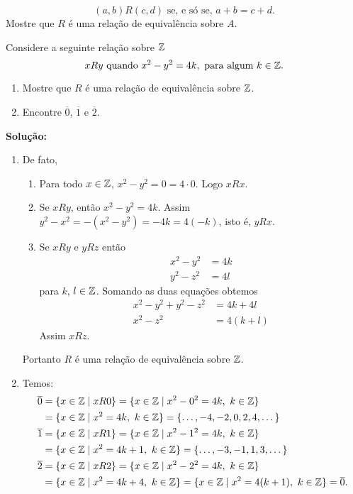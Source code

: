 \documentclass[12pt]{article}
\begin{document}
\[
	(a,b)R(c,d) \mbox{ se, e s\'o se, } a + b = c + d.
\]
Mostre que $R$ \'e uma rela\c{c}\~ao de equival\^encia sobre $A$.

\vspace{.5cm}

\questao Considere a seguinte rela\c{c}\~ao sobre $\mathbb{Z}$
\[
	xRy \mbox{ quando } x^2 - y^2 = 4k, \mbox{ para algum } k \in \mathbb{Z}.
\]

\begin{enumerate}[label={\alph*})]
	\item Mostre que $R$ \'e uma rela{\c c}{\~a}o de equival{\^e}ncia sobre $\mathbb{Z}$.
	\item Encontre $\overline{0}$, $\overline{1}$ e $\overline{2}$.
\end{enumerate}

\noindent\textbf{Solu\c{c}\~ao:}
	\begin{enumerate}[label={\alph*})]
		\item De fato,
		\begin{enumerate}[label={\roman*})]
			\item Para todo $x \in \mathbb{Z}$, $x^2 - y^2 = 0 = 4\cdot 0$. Logo $xRx$.
			\item Se $xRy$, ent\~ao $x^2 - y^2 = 4k$. Assim $y^2 - x^2 = -(x^2 - y^2) = -4k = 4(-k)$, isto \'e, $yRx$.
			\item Se $xRy$ e $yRz$ ent\~ao
			\begin{align*}
				x^2 - y^2 &= 4k\\
				y^2 - z^2 &= 4l
			\end{align*}
			para $k$, $l \in \mathbb{Z}$.
			Somando as duas equa\c{c}\~oes obtemos
			\begin{align*}\label{terceira_equacao}
				x^2 - y^2 + y^2 - z^2 &= 4k + 4l\\
				x^2 - z^2 &= 4(k + l)
			\end{align*}
			Assim $xRz$.
		\end{enumerate}

		Portanto $R$ \'e uma rela\c{c}\~ao de equival\^encia sobre $\mathbb{Z}$.

		\item Temos:
		\begin{align*}
			\overline{0} &= \{x \in \mathbb{Z} \mid xR0\} = \{x \in \mathbb{Z} \mid x^2 - 0^2 = 4k,\ k \in \mathbb{Z}\} \\
			&= \{x \in \mathbb{Z} \mid x^2 = 4k, \ k \in \mathbb{Z}\} = \{\dots, -4,-2,0,2,4, \dots\}\\
			\overline{1} &= \{x \in \mathbb{Z} \mid xR1\} = \{x \in \mathbb{Z} \mid x^2 - 1^2 = 4k,\ k \in \mathbb{Z}\} \\
			&= \{x \in \mathbb{Z} \mid x^2 = 4k + 1, \ k \in \mathbb{Z}\} = \{\dots, -3,-1,1,3, \dots\}\\
			\overline{2} &= \{x \in \mathbb{Z} \mid xR2\} = \{x \in \mathbb{Z} \mid x^2 - 2^2 = 4k,\ k \in \mathbb{Z}\} \\
			&= \{x \in \mathbb{Z} \mid x^2 = 4k + 4, \ k \in \mathbb{Z}\} = \{x \in \mathbb{Z} \mid x^2 = 4(k + 1), \ k \in \mathbb{Z}\} = \overline{0}.
		\end{align*}
	\end{enumerate}
\end{document}
